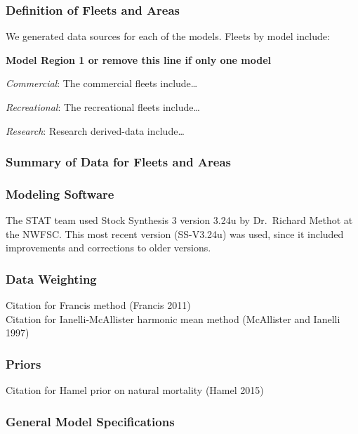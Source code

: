 \documentclass[12pt,]{article}
\begin{document}
\subsubsection{Definition of Fleets and
Areas}\label{definition-of-fleets-and-areas}

We generated data sources for each of the models. Fleets by model
include:

\textbf{Model Region 1 or remove this line if only one model}

\emph{Commercial}: The commercial fleets include\ldots{}

\emph{Recreational}: The recreational fleets include\ldots{}

\emph{Research}: Research derived-data include\ldots{}

\subsubsection{Summary of Data for Fleets and
Areas}\label{summary-of-data-for-fleets-and-areas}

\subsubsection{Modeling Software}\label{modeling-software}

The STAT team used Stock Synthesis 3 version 3.24u by Dr.~Richard Methot
at the NWFSC. This most recent version (SS-V3.24u) was used, since it
included improvements and corrections to older versions.

\subsubsection{Data Weighting}\label{data-weighting}

Citation for Francis method (Francis 2011)\\
Citation for Ianelli-McAllister harmonic mean method (McAllister and
Ianelli 1997)

\subsubsection{Priors}\label{priors}

Citation for Hamel prior on natural mortality (Hamel 2015)

\subsubsection{General Model
Specifications}\label{general-model-specifications}
\end{document}
